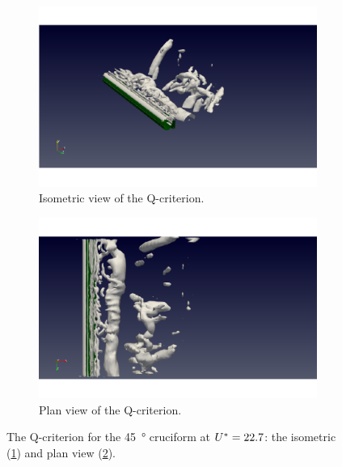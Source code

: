\documentclass[oneside]{utmthesis}
\begin{document}
\begin{figure}
  \centering
  \begin{subfigure}[h]{0.9\textwidth}
    \includegraphics[width=\textwidth]{figs/qIso000U10}
    \caption{Isometric view of the Q-criterion.}
    \label{fig:qIso000U10}
  \end{subfigure}

  \begin{subfigure}[h]{0.9\textwidth}
    \includegraphics[width=\textwidth]{figs/qTop000U10}
    \caption{Plan view of the Q-criterion.}
    \label{fig:qTop000U10}
  \end{subfigure}

  \caption{The Q-criterion for the \SI{45}{\degree} cruciform at $U^{*} = 22.7$: the isometric (\ref{fig:qIso000U10}) and plan view (\ref{fig:qTop000U10}).} \label{fig:qCrit000U10}
\end{figure}
\end{document}
